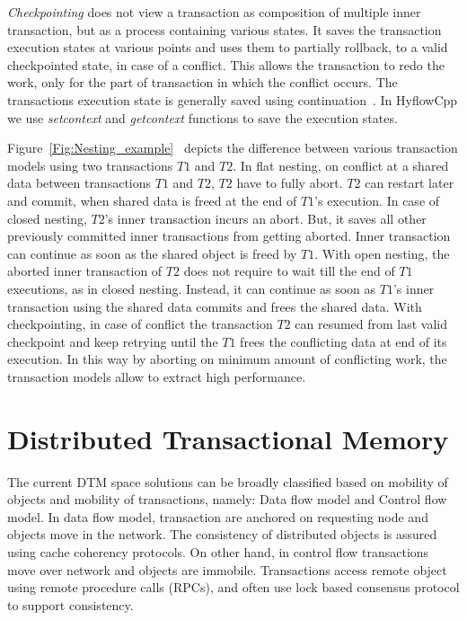 \documentclass[12pt,english]{report}
\begin{document}
\textit{Checkpointing} does not view a transaction as composition of multiple inner transaction, but as a process containing various states. It saves the transaction execution states at various points and uses them to partially rollback, to a valid checkpointed state, in case of a conflict. This allows the transaction to redo the work, only for the part of transaction in which the conflict occurs. The transactions execution state is generally saved using continuation~\cite{flanagan1993essence}. In HyflowCpp we use \textit{setcontext} and \textit{getcontext} functions to save the execution states.     

Figure~\ref{Fig:Nesting_example}~\cite{Alex:ONTFA2367601} depicts the difference between various transaction models using two transactions $T1$ and $T2$. In flat nesting, on conflict at a shared data between transactions $T1$ and $T2$, $T2$ have to fully abort. $T2$ can restart later and commit, when shared data is freed at the end of $T1$'s execution. In case of closed nesting, $T2$'s inner transaction incurs an abort. But, it saves all other previously committed inner transactions from getting aborted. Inner transaction can continue as soon as the shared object is freed by $T1$. With open nesting, the aborted inner transaction of $T2$ does not require to wait till the end of $T1$ executions, as in closed nesting. Instead, it can continue as soon as $T1$'s inner transaction using the shared data commits and frees the shared data. With checkpointing, in case of conflict the transaction $T2$ can resumed from last valid checkpoint and keep retrying until the $T1$ frees the conflicting data at end of its execution. In this way by aborting on minimum amount of conflicting work, the transaction models allow to extract high performance. 

\section{Distributed Transactional Memory}

The current DTM space solutions can be broadly classified based on mobility of objects and mobility of transactions, namely: Data flow model and Control flow model. In data flow model, transaction are anchored on requesting node and objects move in the network. The consistency of distributed objects is assured using cache coherency protocols. On other hand, in control flow transactions move over network and objects are immobile. Transactions access remote object using remote procedure calls (RPCs), and often use lock based consensus protocol to support consistency.
\end{document}
